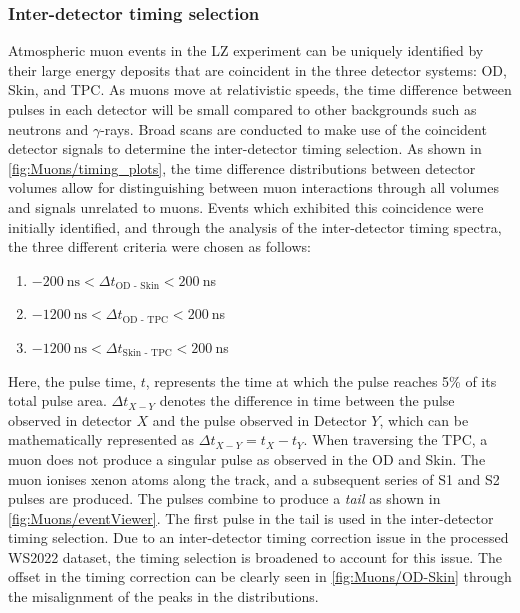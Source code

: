 \subsubsection{Inter-detector timing selection}\label{sec:Muons/MuonFluxTimingSelection}
Atmospheric muon events in the LZ experiment can be uniquely identified by their large energy deposits that are coincident in the three detector systems: OD, Skin, and TPC. As muons move at relativistic speeds, the time difference between pulses in each detector will be small compared to other backgrounds such as neutrons and $\gamma$-rays.
Broad scans are conducted to make use of the coincident detector signals to determine the inter-detector timing selection. As shown in \autoref{fig:Muons/timing_plots}, the time difference distributions between detector volumes allow for distinguishing between muon interactions through all volumes and signals unrelated to muons. Events which exhibited this coincidence were initially identified, and through the analysis of the inter-detector timing spectra, the three different criteria were chosen as follows:
 \begin{enumerate}
    \item $-200~\text{ns} < \Delta t_{\text{OD - Skin}} < 200~$ns
    \item $-1200~\text{ns} < \Delta t_{\text{OD - TPC}} < 200~$ns
    \item $-1200~\text{ns} < \Delta t_{\text{Skin - TPC}} < 200~$ns
\end{enumerate}
Here, the pulse time, $t$, represents the time at which the pulse reaches 5\% of its total pulse area. $\Delta t_{X-Y}$ denotes the difference in time between the pulse observed in detector $X$ and the pulse observed in Detector $Y$, which can be mathematically represented as $\Delta t_{X-Y}=t_X-t_Y$. When traversing the TPC, a muon does not produce a singular pulse as observed in the OD and Skin. The muon ionises xenon atoms along the track, and a subsequent series of S1 and S2 pulses are produced. The pulses combine to produce a \textit{tail} as shown in \autoref{fig:Muons/eventViewer}. The first pulse in the tail is used in the inter-detector timing selection. Due to an inter-detector timing correction issue in the processed WS2022 dataset, the timing selection is broadened to account for this issue. The offset in the timing correction can be clearly seen in \autoref{fig:Muons/OD-Skin} through the misalignment of the peaks in the distributions.

